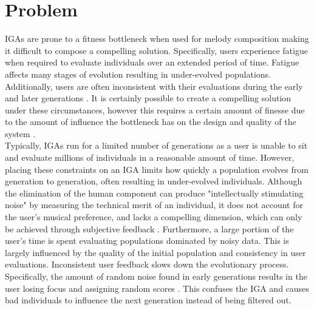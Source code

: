 \documentclass[12pt]{article} %
\begin{document}
\section{Problem}
IGAs are prone to a fitness bottleneck when used for melody composition making it difficult to compose a compelling solution. Specifically, users experience fatigue when required to evaluate individuals over an extended period of time. Fatigue affects many stages of evolution resulting in under-evolved populations. Additionally, users are often inconsistent with their evaluations during the early and later generations \cite{Biles94}. It is certainly possible to create a compelling solution under these circumstances, however this requires a certain amount of finesse due to the amount of influence the bottleneck has on the design and quality of the system \cite{Biles94}. \\


Typically, IGAs run for a limited number of generations as a user is unable to sit and evaluate millions of individuals in a reasonable amount of time. However, placing these constraints on an IGA limits how quickly a population evolves from generation to generation, often resulting in under-evolved individuals. Although the elimination of the human component can produce "intellectually stimulating noise" \cite{RBecker} by measuring the technical merit of an individual, it does not account for the user's musical preference, and lacks a compelling dimension, which can only be achieved through subjective feedback \cite{Biles94}. Furthermore, a large portion of the user's time is spent evaluating populations dominated by noisy data. This is largely influenced by the quality of the initial population and consistency in user evaluations. Inconsistent user feedback slows down the evolutionary process. Specifically, the amount of random noise found in early generations results in the user losing focus and assigning random scores \cite{Biles94}. This confuses the IGA and causes bad individuals to influence the next generation instead of being filtered out. \\
\end{document}
